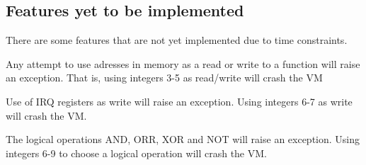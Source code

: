 \subsection{Features yet to be implemented}
There are some features that are not yet implemented due to time constraints.

Any attempt to use adresses in memory as a read or write to a function will raise an exception. That is, using integers 3-5 as read/write will crash the VM

Use of IRQ registers as write will raise an exception. Using integers 6-7 as write will crash the VM.

The logical operations AND, ORR, XOR and NOT will raise an exception. Using integers 6-9 to choose a logical operation will crash the VM.
